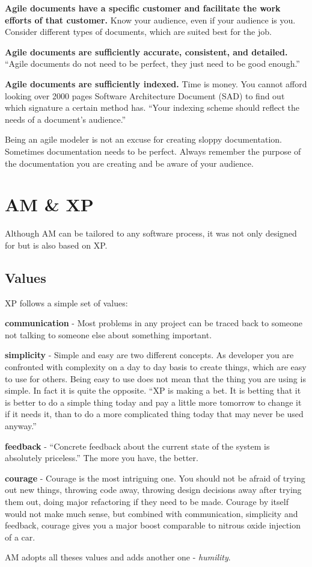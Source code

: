 \begin{description}
\item {\bf Agile documents have a specific customer and facilitate the work
efforts of that customer.} Know your audience, even if your audience is you.
Consider different types of documents, which are suited best for the job.
\item {\bf Agile documents are sufficiently accurate, consistent, and detailed.}
\enquote{Agile documents do not need to be perfect, they just need to be good
enough.}\cite{Ambler200204}
\item {\bf Agile documents are sufficiently indexed.} Time is money. You cannot
afford looking over 2000 pages Software Architecture Document (SAD) to find out
which signature a certain method has. \enquote{Your indexing scheme
should reflect the needs of a document's audience.}\cite{Ambler200204}
\end{description}
Being an agile modeler is not an excuse for creating sloppy documentation.
Sometimes documentation needs to be perfect. Always remember the purpose of the
documentation you are creating and be aware of your audience.

\section{AM \& XP}
Although AM can be tailored to any software process, it was not only designed
for but is also based on XP. 
\subsection{Values}
XP follows a simple set of values:
\begin{description}
  \item {\bf communication} - Most problems in any project can be traced back to
  someone not talking to someone else about something important.
  \item {\bf simplicity} - Simple and easy are two different concepts. As
  developer you are confronted with complexity on a day to day basis to create
  things, which are easy to use for others. Being easy to use does not mean that
  the thing you are using is simple. In fact it is quite the opposite.
  \enquote{XP is making a bet. It is betting that it is better to do a simple
  thing today and pay a little more tomorrow to change it if it needs it, than to do a more
  complicated thing today that may never be used anyway.}\cite{BeckAndres200411}
  \item {\bf feedback} - \enquote{Concrete feedback about
the current state of the system is absolutely priceless.}\cite{BeckAndres200411}
The more you have, the better.
  \item {\bf courage} - Courage is the most intriguing one. You should not be
  afraid of trying out new things, throwing code away, throwing design decisions
  away after trying them out, doing major refactoring if they need to be made.
  Courage by itself would not make much sense, but combined with communication,
  simplicity and feedback, courage gives you a major boost comparable to nitrous
  oxide injection of a car.
\end{description}
AM adopts all theses values and adds another one - \emph{humility}.

